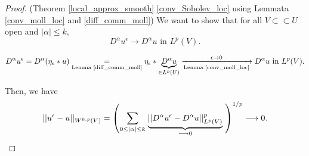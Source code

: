 \documentclass[12pt]{article}
\theoremstyle{definition}
\begin{document}
\begin{proof}
(Theorem \ref{local_approx_smooth} \ref{conv_Sobolev_loc} using Lemmata \ref{conv_moll_loc} and \ref{diff_comm_moll}) We want to show that for all $V\subset\subset U$ open and $|\alpha|\leq k$,
\[D^\alpha u^\epsilon\longrightarrow D^\alpha u\text{ in }L^p(V).\]

\[D^\alpha u^\epsilon=D^\alpha(\eta_\epsilon*u)\underset{\text{Lemma \ref{diff_comm_moll}}}=\eta_\epsilon*\underbrace{D^\alpha u}_{\in L^p(U)}\xrightarrow[\text{Lemma \ref{conv_moll_loc}}]{\epsilon\to0}D^\alpha u\text{ in }L^p(V).\]

Then, we have
\[||u^\epsilon-u||_{W^{k,p}(V)}=\left(\sum_{0\leq|\alpha|\leq k}\right.\underbrace{||D^\alpha u^\epsilon-D^\alpha u||_{L^p(V)}^p}_{\longrightarrow0}\left.\vphantom{\sum_{0\leq|\alpha|\leq k}}\right)^{1/p}\longrightarrow0.\]
\end{proof}
\end{document}
